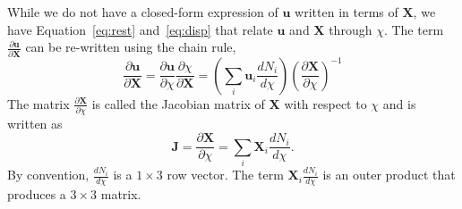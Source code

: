While we do not have a closed-form expression of $\mathbf{u}$ written in terms of $\mathbf{X}$,
we have Equation~\ref{eq:rest} and~\ref{eq:disp} that relate $\mathbf{u}$ and $\mathbf{X}$ through $\chi$.
The term $\frac{\partial \mathbf{u}}{\partial \mathbf{X}}$ can be re-written using the chain rule,
\[
\frac{\partial \mathbf{u}}{\partial \mathbf{X}}=
\frac{\partial \mathbf{u}}{\partial \chi}
\frac{\partial \chi}{\partial \mathbf{X}}=
(\sum_i\mathbf{u}_i\frac{dN_i}{d\chi})(\frac{\partial \mathbf{X}}{\partial \chi})^{-1}
\]
The matrix $\frac{\partial \mathbf{X}}{\partial \chi}$ is called the Jacobian matrix of $\mathbf{X}$ with respect to $\chi$ and is written as
\[
\mathbf{J}=\frac{\partial \mathbf{X}}{\partial \chi}
= \sum_i\mathbf{X}_i\frac{dN_i}{d\chi}.
\]
By convention, $\frac{dN_i}{d\chi}$ is a $1\times 3$ row vector.
The term $\mathbf{X}_i\frac{dN_i}{d\chi}$ is an outer product that produces a $3\times 3$ matrix.

\section{}
